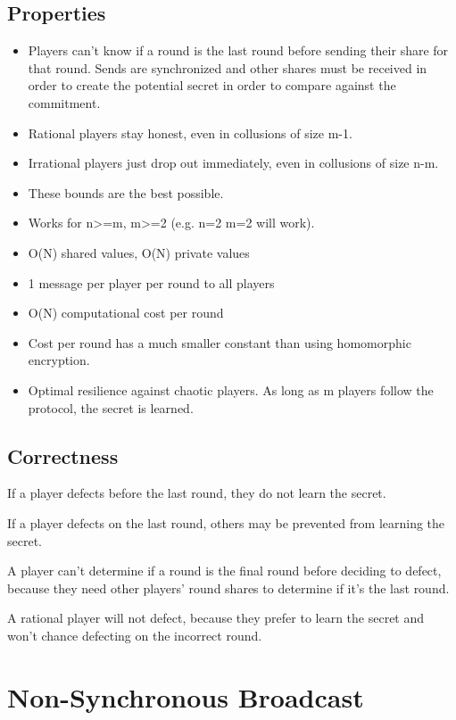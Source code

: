 \documentclass{article}
\begin{document}
\subsection{Properties}
\begin{itemize}
	\item Players can't know if a round is the last round before sending their share for that round.
	\subitem Sends are synchronized and other shares must be received in order to create the potential secret in order to compare against the commitment.
	\item Rational players stay honest, even in collusions of size m-1.
	\item Irrational players just drop out immediately, even in collusions of size n-m.
	\item These bounds are the best possible.
	\item Works for n>=m, m>=2 (e.g. n=2 m=2 will work).
	\item O(N) shared values, O(N) private values
	\item 1 message per player per round to all players
	\item O(N) computational cost per round
	\item Cost per round has a much smaller constant than using homomorphic encryption.
	\item Optimal resilience against chaotic players. As long as m players follow the protocol, the secret is learned.
\end{itemize}

\subsection{Correctness}

If a player defects before the last round, they do not learn the secret.

If a player defects on the last round, others may be prevented from learning the secret.

A player can't determine if a round is the final round before deciding to defect, because they need other players' round shares to determine if it's the last round.

A rational player will not defect, because they prefer to learn the secret and won't chance defecting on the incorrect round.

\section{Non-Synchronous Broadcast}
\end{document}
